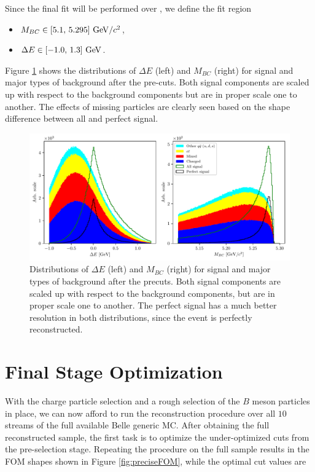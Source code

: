 Since the final fit will be performed over \vars, we define the fit region
\begin{itemize}
	\item $M_{BC} \in [5.1,\,5.295]\mathrm{~GeV}/c^2$,
	\item $\Delta E \in [-1.0,\,1.3]\mathrm{~GeV}$.
\end{itemize}

Figure \ref{fig:mbc_de_pre} shows the distributions of $\Delta E$ (left) and $M_{BC}$ (right) for signal and major types of background after the pre-cuts. Both signal components are scaled up with respect to the background components but are in proper scale one to another. The effects of missing particles are clearly seen based on the shape difference between all and perfect signal.

\begin{figure}[!htb]
	\centering
	\captionsetup{width=0.8\linewidth}
	\includegraphics[width=\linewidth]{fig/mbc_de_pre}
	\caption{Distributions of $\Delta E$ (left) and $M_{BC}$ (right) for signal and major types of background after the precuts. Both signal components are scaled up with respect to the background components, but are in proper scale one to another. The perfect signal has a much better resolution in both distributions, since the event is perfectly reconstructed.}
	\label{fig:mbc_de_pre}
\end{figure}

\section{Final Stage Optimization}

With the charge particle selection and a rough selection of the $B$ meson particles in place, we can now afford to run the reconstruction procedure over all $10$ streams of the full available Belle generic MC. After obtaining the full reconstructed sample, the first task is to optimize the under-optimized cuts from the pre-selection stage. Repeating the procedure on the full sample results in the FOM shapes shown in Figure \ref{fig:preciseFOM}, while the optimal cut values are

